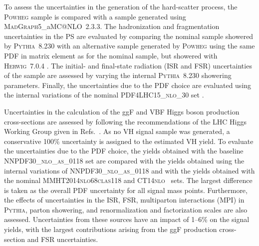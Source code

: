 \documentclass[cernpreprint, backref=false, texlive=2020, UKenglish, dvipsnames, block=none, texmf]{atlasdoc}
\begin{document}
 
To assess the uncertainties in the generation of the hard-scatter \ttbar process, the \textsc{Powheg} sample is compared with a sample generated using \textsc{MadGraph5}\_aMC@NLO~2.3.3. The hadronization and fragmentation uncertainties in the PS are evaluated by comparing the nominal sample showered by \textsc{Pythia~8.230} with an alternative sample generated by \textsc{Powheg} using the same PDF in matrix element as for the nominal sample, but showered with \textsc{Herwig}~7.0.4 \cite{Bahr:2008pv, Bellm:2015jjp}. The initial- and final-state radiation (ISR and FSR) uncertainties of the \ttbar sample are assessed by varying the internal \textsc{Pythia~8.230} showering parameters.
Finally, the uncertainties due to the PDF choice are evaluated using the internal variations of the nominal \textsc{PDF4LHC15\_nlo\_30} set \cite{Butterworth:2015oua}.
 
 
Uncertainties in the calculation of the ggF and VBF Higgs boson production cross-sections are assessed by following the recommendations of the LHC Higgs Working Group given in Refs.~\cite{deFlorian:2016spz, Heinemeyer:2013tqa}.
As no VH signal sample was generated, a conservative  100\%  uncertainty is assigned to the estimated VH yield.
To evaluate the  uncertainties due to the PDF choice, the yields obtained with the baseline \textsc{NNPDF30\_nlo\_as\_0118} set are compared with the yields obtained using the internal variations of \textsc{NNPDF30\_nlo\_as\_0118} and with the yields obtained with the nominal \textsc{MMHT2014nlo68clas118} \cite{Harland-Lang:2014zoa} and \textsc{CT14nlo}~\cite{Dulat:2015mca} sets. The largest difference is taken as the overall PDF uncertainty for all signal mass points. Furthermore, the effects of uncertainties in the ISR, FSR, multiparton interactions (MPI) in \textsc{Pythia}, parton showering, and renormalization and factorization scales are also  assessed. Uncertainties from these sources have an impact of 1--6\% on the signal yields, with the largest contributions arising from the ggF production cross-section and FSR uncertainties.
 
 
 
 
 
 
\end{document}
